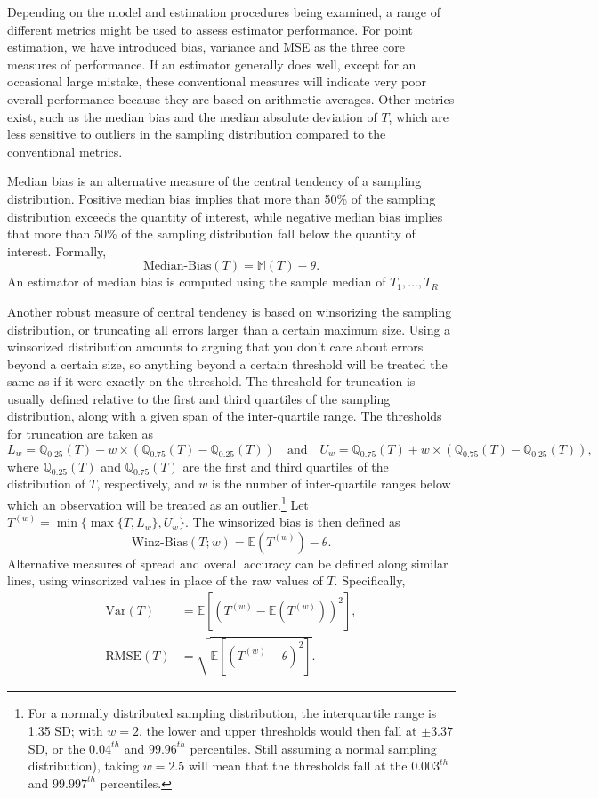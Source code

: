 \documentclass[
]{book}
\newcommand{\E}{\mathbb{E}}
\newcommand{\M}{\mathbb{M}}
\newcommand{\Q}{\mathbb{Q}}
\newcommand{\Var}{\text{Var}}
\newcommand{\RMSE}{\text{RMSE}}
\begin{document}
Depending on the model and estimation procedures being examined, a range of different metrics might be used to assess estimator performance.
For point estimation, we have introduced bias, variance and MSE as the three core measures of performance.
If an estimator generally does well, except for an occasional large mistake, these conventional measures will indicate very poor overall performance because they are based on arithmetic averages.
Other metrics exist, such as the median bias and the median absolute deviation of \(T\), which are less sensitive to outliers in the sampling distribution compared to the conventional metrics.

Median bias is an alternative measure of the central tendency of a sampling distribution.
Positive median bias implies that more than 50\% of the sampling distribution exceeds the quantity of interest, while negative median bias implies that more than 50\% of the sampling distribution fall below the quantity of interest.
Formally,
\[ 
\text{Median-Bias}(T) = \M(T) - \theta \label{eq:median-bias}.
\]
An estimator of median bias is computed using the sample median of \(T_1,...,T_R\).

Another robust measure of central tendency is based on winsorizing the sampling distribution, or truncating all errors larger than a certain maximum size.
Using a winsorized distribution amounts to arguing that you don't care about errors beyond a certain size, so anything beyond a certain threshold will be treated the same as if it were exactly on the threshold.
The threshold for truncation is usually defined relative to the first and third quartiles of the sampling distribution, along with a given span of the inter-quartile range.
The thresholds for truncation are taken as
\[
L_w = \Q_{0.25}(T) - w \times (\Q_{0.75}(T) - \Q_{0.25}(T)) \quad \text{and} \quad U_w = \Q_{0.75}(T) + w \times (\Q_{0.75}(T) - \Q_{0.25}(T)),
\]
where \(\Q_{0.25}(T)\) and \(\Q_{0.75}(T)\) are the first and third quartiles of the distribution of \(T\), respectively, and \(w\) is the number of inter-quartile ranges below which an observation will be treated as an outlier.\footnote{For a normally distributed sampling distribution, the interquartile range is 1.35 SD; with \(w = 2\), the lower and upper thresholds would then fall at \(\pm 3.37\) SD, or the \(0.04^{th}\) and \(99.96^{th}\) percentiles.
  Still assuming a normal sampling distribution), taking \(w = 2.5\) will mean that the thresholds fall at the \(0.003^{th}\) and \(99.997^{th}\) percentiles.}
Let \(T^{(w)} = \min\{\max\{T, L_w\}, U_w\}\).
The winsorized bias is then defined as
\[
\text{Winz-Bias}(T; w) = \E\left(T^{(w)}\right) - \theta. \label{eq:winsorized-bias}
\]
Alternative measures of spread and overall accuracy can be defined along similar lines, using winsorized values in place of the raw values of \(T\).
Specifically,
\[
\begin{aligned}
\Var(T) &= \E\left[\left(T^{(w)} - \E (T^{(w)})\right)^2 \right], \\
\RMSE(T) &= \sqrt{\E\left[\left(T^{(w)} - \theta\right)^2 \right]}.
\end{aligned}
\label{eq:winsorized-variance-RMSE}
\]
\end{document}
